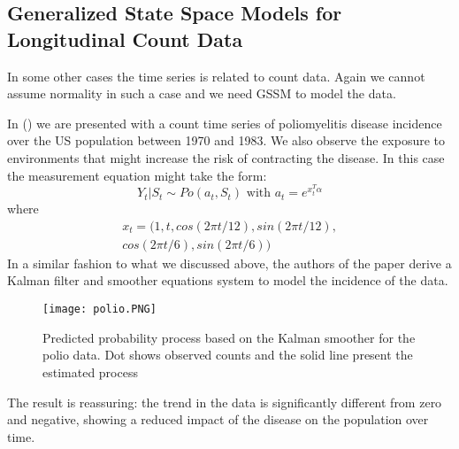 \subsection{Generalized State Space Models for Longitudinal Count Data}

In some other cases the time series is related to count data. Again we cannot assume normality in such a case and we need GSSM to model the data.

In (\cite{Scot-1988}) we are presented with a count time series of poliomyelitis disease incidence over the US population between 1970 and 1983. We also observe the exposure to environments that might increase the risk of contracting the disease. In this case the measurement equation might take the form:
\begin{equation}
    Y_t|S_t \sim Po(a_t, S_t) \text{ with } a_t = e^{x_t^T\alpha}
\end{equation}
where 
\begin{equation}
\begin{gathered}
    x_t = (1, t, cos(2\pi t/12), sin(2\pi t/12), \\
    cos(2\pi t/6), sin(2\pi t/6))
    \end{gathered}
\end{equation}
In a similar fashion to what we discussed above, the authors of the paper derive a Kalman filter and smoother equations system to model the incidence of the data.

\begin{figure}
    \centering
    \texttt{[image: polio.PNG]}
    \caption{Predicted probability process based on the Kalman smoother for the polio data. Dot shows observed counts and the solid line present the estimated process}
    \label{fig:polio}
\end{figure}

The  result is reassuring: the trend in the data is significantly different from zero and negative, showing a reduced impact of the disease on the population over time.